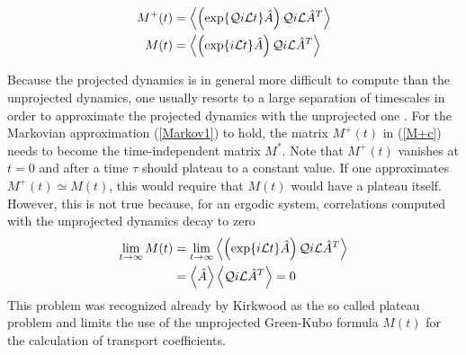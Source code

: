 \documentclass[b5paper,openright,10pt]{book}
\newcommand{\llangle}{\left\langle}
\newcommand{\rrangle}{\right\rangle}
\begin{document}
\begin{align}
M^+(t)&=
  \llangle\left(\exp\{{\cal Q}i{\cal L}t\}  \hat{A}\right){\cal Q}i{\cal L}\hat{A}^{T} \rrangle
\nonumber\\
M(t)&=
  \llangle\left(\exp\{i{\cal L}t\}  \hat{A}\right){\cal Q}i{\cal L}\hat{A}^{T} \rrangle
\label{m+}
\end{align}

Because the projected dynamics is in general more difficult to compute
than  the  unprojected  dynamics,  one  usually  resorts  to  a  large
separation  of  timescales  in  order  to approximate  the  projected
dynamics with  the unprojected  one \cite{Zwanzig1961,Selwyn1971,Mazur1970}.
For the  Markovian approximation  (\ref{Markov1}) to hold,  the matrix
$M^+(t)$ in  (\ref{M+c}) needs  to become the  time-independent matrix
$M^*$.  Note that  $M^+(t)$ vanishes at $t=0$ and after  a time $\tau$
should plateau to a constant value.  If one approximates $M^+(t)\simeq
M(t)$,  this   would  require  that   $M(t)$  would  have   a  plateau
itself.  However, this  is not  true because,  for an  ergodic system,
correlations computed with the unprojected dynamics decay to zero
\begin{align}
  \lim_{t\to\infty}M(t)&= \lim_{t\to\infty} \llangle\left(\exp\{i{\cal L}t\}  \hat{A}\right){\cal Q}i{\cal L}\hat{A}^{T} \rrangle
\nonumber\\
&=
 \llangle  \hat{A}\rrangle\llangle{\cal Q}i{\cal L}\hat{A}^{T} \rrangle=0
\end{align}
This  problem was  recognized already  by  Kirkwood as  the so  called
plateau problem \cite{Kirkwood1949,Espanol1993}  and limits the
use of the  unprojected Green-Kubo formula $M(t)$  for the calculation
of transport coefficients.
\end{document}
